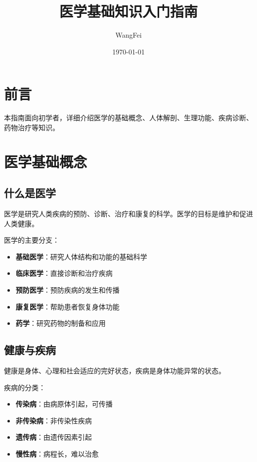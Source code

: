 \documentclass[12pt,UTF8]{ctexbook}
\title{\heiti\zihao{0} 医学基础知识入门指南}
\author{WangFei}
\date{\today}
\begin{document}
\maketitle
\tableofcontents

\frontmatter
\chapter{前言}

本指南面向初学者，详细介绍医学的基础概念、人体解剖、生理功能、疾病诊断、药物治疗等知识。

\mainmatter

\chapter{医学基础概念}
\label{chap:medicine_basics}

\section{什么是医学}
\label{sec:what_is_medicine}

医学是研究人类疾病的预防、诊断、治疗和康复的科学。医学的目标是维护和促进人类健康。

医学的主要分支：
\begin{itemize}
    \item \textbf{基础医学}：研究人体结构和功能的基础科学
    \item \textbf{临床医学}：直接诊断和治疗疾病
    \item \textbf{预防医学}：预防疾病的发生和传播
    \item \textbf{康复医学}：帮助患者恢复身体功能
    \item \textbf{药学}：研究药物的制备和应用
\end{itemize}

\section{健康与疾病}
\label{sec:health_and_disease}

健康是身体、心理和社会适应的完好状态，疾病是身体功能异常的状态。

疾病的分类：
\begin{itemize}
    \item \textbf{传染病}：由病原体引起，可传播
    \item \textbf{非传染病}：非传染性疾病
    \item \textbf{遗传病}：由遗传因素引起
    \item \textbf{慢性病}：病程长，难以治愈
\end{itemize}
\end{document}
